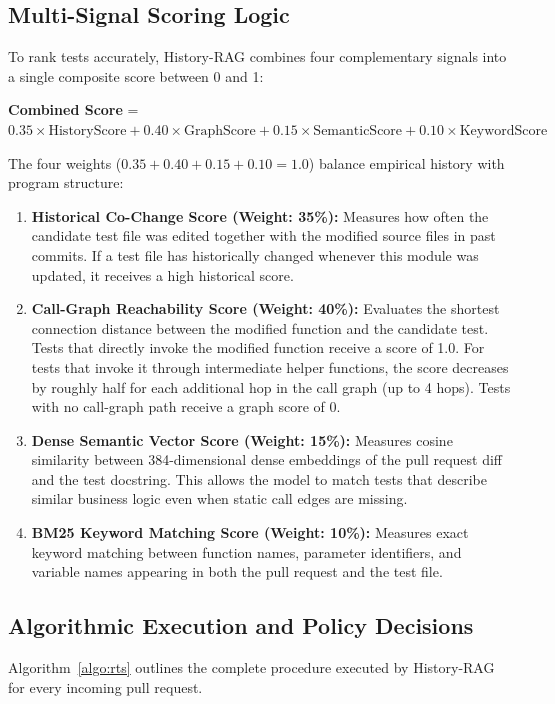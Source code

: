 \documentclass[12pt,onecolumn,draftclsnofoot]{IEEEtran}
\begin{document}
\subsection{Multi-Signal Scoring Logic}
To rank tests accurately, History-RAG combines four complementary signals into a single composite score between 0 and 1:
\begin{center}
\textbf{Combined Score} = $0.35 \times \text{HistoryScore} + 0.40 \times \text{GraphScore} + 0.15 \times \text{SemanticScore} + 0.10 \times \text{KeywordScore}$
\end{center}
The four weights ($0.35 + 0.40 + 0.15 + 0.10 = 1.0$) balance empirical history with program structure:
\begin{enumerate}
    \item \textbf{Historical Co-Change Score (Weight: 35\%):} Measures how often the candidate test file was edited together with the modified source files in past commits. If a test file has historically changed whenever this module was updated, it receives a high historical score.
    \item \textbf{Call-Graph Reachability Score (Weight: 40\%):} Evaluates the shortest connection distance between the modified function and the candidate test. Tests that directly invoke the modified function receive a score of 1.0. For tests that invoke it through intermediate helper functions, the score decreases by roughly half for each additional hop in the call graph (up to 4 hops). Tests with no call-graph path receive a graph score of 0.
    \item \textbf{Dense Semantic Vector Score (Weight: 15\%):} Measures cosine similarity between 384-dimensional dense embeddings of the pull request diff and the test docstring. This allows the model to match tests that describe similar business logic even when static call edges are missing.
    \item \textbf{BM25 Keyword Matching Score (Weight: 10\%):} Measures exact keyword matching between function names, parameter identifiers, and variable names appearing in both the pull request and the test file.
\end{enumerate}

\subsection{Algorithmic Execution and Policy Decisions}
Algorithm~\ref{algo:rts} outlines the complete procedure executed by History-RAG for every incoming pull request.
\end{document}
